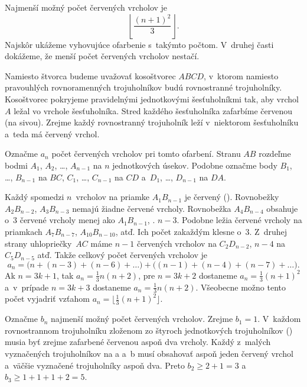 {%
Najmenší možný počet červených vrcholov je
$$
\left\lfloor \frac{(n+1)^2}3\right\rfloor.
$$
Najskôr ukážeme vyhovujúce ofarbenie s~takýmto počtom. V~druhej časti dokážeme, že menší počet červených vrcholov nestačí.

Namiesto štvorca budeme uvažovať kosoštvorec $ABCD$, v~ktorom namiesto pravouhlých rovnoramenných trojuholníkov budú rovnostranné trojuholníky. Kosoštvorec pokryjeme pravidelnými jednotkovými šesťuholníkmi tak, aby vrchol $A$ ležal vo vrchole šesťuholníka. Stred každého šesťuholníka zafarbíme červenou (na \obr{} sivou).
Zrejme každý rovnostranný trojuholník leží v~niektorom šesťuholníku a~teda má červený vrchol.
%

Označme $a_n$ počet červených vrcholov pri tomto ofarbení. Stranu $AB$ rozdeľme bodmi $A_1$, $A_2$, \dots, $A_{n-1}$ na $n$ jednotkových úsekov. Podobne označme body $B_1$, \dots, $B_{n-1}$ na $BC$, $C_1$, \dots, $C_{n-1}$ na $CD$ a~$D_1$, \dots, $D_{n-1}$ na $DA$.

Každý spomedzi $n$~vrcholov na priamke $A_1B_{n-1}$ je červený (\obr). Rovnobežky $A_2B_{n-2}$, $A_3B_{n-3}$ nemajú žiadne červené vrcholy. Rovnobežka $A_4B_{n-4}$ obsahuje o~3 červené vrcholy menej ako $A_1B_{n-1}$, \tj. $n-3$. Podobne ležia červené vrcholy na priamkach $A_7B_{n-7}$, $A_{10}B_{n-10}$, atď. Ich počet zakaždým klesne o~3.
Z~druhej strany uhlopriečky~$AC$ máme $n-1$ červených vrcholov na $C_2D_{n-2}$, $n-4$ na $C_5D_{n-5}$ atď.
Takže celkový počet červených vrcholov je
$$
a_n = \bigl(n+(n-3)+(n-6)+\dots\bigr)+\bigl((n-1)+(n-4)+(n-7)+\dots\bigr).
$$
Ak $n=3k+1$, tak $a_n = \frac13n(n+2)$, pre $n=3k+2$ dostaneme $a_n = \frac13(n+1)^2$
a~v~prípade $n = 3k + 3$ dostaneme $a_n = \frac13n(n+2)$. Všeobecne možno tento počet vyjadriť vzťahom $a_n = \lfloor\frac13(n+1)^2\rfloor$.
%

\smallskip
Označme $b_n$ najmenší možný počet červených vrcholov. Zrejme $b_1 = 1$. V~každom rovnostrannom trojuholníku zloženom zo štyroch jednotkových trojuholníkov (\obr) musia byť zrejme zafarbené červenou aspoň dva vrcholy. Každý z~malých vyznačených trojuholníkov na \obr{}a a~b musí obsahovať aspoň jeden červený vrchol a~väčšie vyznačené trojuholníky aspoň dva. Preto $b_2\ge 2 + 1 = 3$ a~$b_3 \ge {1+1+1+2=5}$.




}
